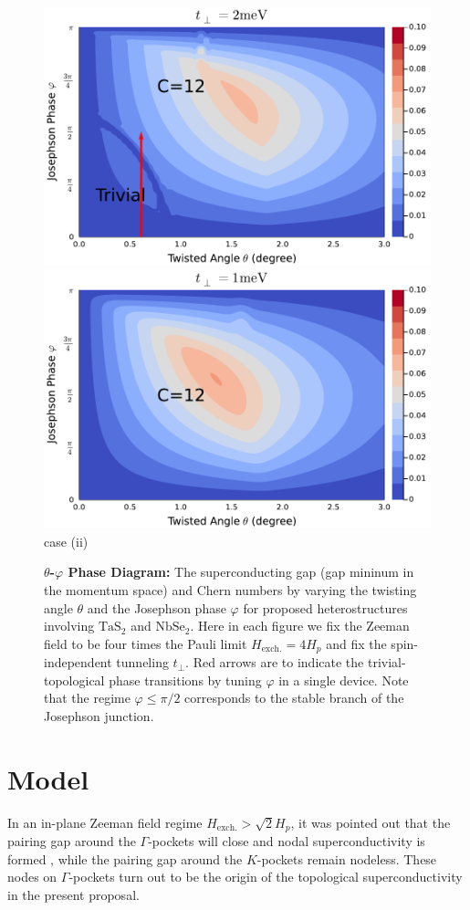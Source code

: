 \begin{figure}
\begin{minipage}{1.0\textwidth}
		\includegraphics[width=0.33\linewidth]{contents/Ising_Top/figures/pdf_files/gap_size_distribution.NbSe2.theta_phi.non-magnetic.t=2.pdf}
		\includegraphics[width=0.33\linewidth]{contents/Ising_Top/figures/pdf_files/gap_size_distribution.NbSe2.theta_phi.non-magnetic.t=1.pdf}
		\\
		case (ii)
	\end{minipage}
	\caption{{\bf $\theta$-$\varphi$ Phase Diagram:} The superconducting gap (gap mininum in the momentum space) and Chern numbers by varying the twisting angle $\theta$ and the Josephson phase $\varphi$ for proposed heterostructures involving $\mathrm{TaS_2}$ and $\mathrm{NbSe_2}$. Here in each figure we fix the Zeeman field to be four times the Pauli limit $H_{\text{exch.}}=4H_p$ and fix the spin-independent tunneling $t_\perp$. Red arrows are to indicate the trivial-topological phase transitions by tuning $\varphi$ in a single device. Note that the regime $\varphi\leq \pi/2$ corresponds to the stable branch of the Josephson junction.}
	\label{fig:theta-phi phase digram}
\end{figure}

\section{Model}
In an in-plane Zeeman field regime $H_{\text{exch.}}>\sqrt{2}H_p$, it was pointed out that the pairing gap around the $\Gamma$-pockets will close and nodal superconductivity is formed \cite{he2018magnetic}, while the pairing gap around the $K$-pockets remain nodeless. These nodes on $\Gamma$-pockets turn out to be the origin of the topological superconductivity in the present proposal.

